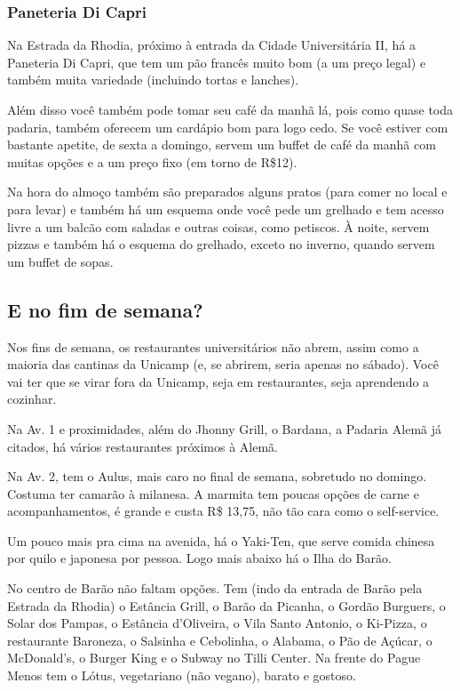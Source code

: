 %
%


\subsubsection{Paneteria Di Capri}

Na Estrada da Rhodia, próximo à entrada da Cidade Universitária II, há a
Paneteria Di Capri, que tem um pão francês muito bom (a um preço legal) e
também muita variedade (incluindo tortas e lanches).

Além disso você também pode tomar seu café da manhã lá, pois como quase toda
padaria, também oferecem um cardápio bom para logo cedo. Se você estiver com
bastante apetite, de sexta a domingo, servem um buffet de café da manhã com
muitas opções e a um preço fixo (em torno de R\$12).

Na hora do almoço também são preparados alguns pratos (para comer no local e
para levar) e também há um esquema onde você pede um grelhado e tem acesso
livre a um balcão com saladas e outras coisas, como petiscos. À noite, servem
pizzas e também há o esquema do grelhado, exceto no inverno, quando servem um
buffet de sopas.

\subsection{E no fim de semana?}

Nos fins de semana, os restaurantes universitários não abrem, assim como a
maioria das cantinas da Unicamp (e, se abrirem, seria apenas no sábado). Você
vai ter que se virar fora da Unicamp, seja em restaurantes, seja aprendendo a
cozinhar.

Na Av. 1 e proximidades, além do Jhonny Grill, o Bardana, a Padaria Alemã já
citados, há vários restaurantes próximos à Alemã.

Na Av. 2, tem o Aulus, mais caro no final de semana, sobretudo no domingo.
Costuma ter camarão à milanesa. A marmita tem poucas opções de carne e
acompanhamentos, é grande e custa R\$ 13,75, não tão cara como o self-service.

Um pouco mais pra cima na avenida, há o Yaki-Ten, que serve comida chinesa por
quilo e japonesa por pessoa. Logo mais abaixo há o Ilha do Barão.

No centro de Barão não faltam opções. Tem (indo da entrada de Barão pela
Estrada da Rhodia) o Estância Grill, o Barão da Picanha, o Gordão Burguers, o
Solar dos Pampas, o Estância d'Oliveira, o Vila Santo Antonio, o Ki-Pizza, o
restaurante Baroneza, o Salsinha e Cebolinha, o Alabama, o Pão de Açúcar, o
McDonald's, o Burger King e o Subway no Tilli Center. Na frente do Pague Menos
tem o Lótus, vegetariano (não vegano), barato e gostoso.

